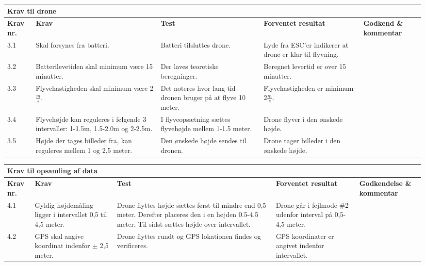     \centering
    \begin{tabular}{|p{}|p{3.2 cm}|p{3.2 cm}|p{3.2 cm}|p{2.2 cm}|}
			\hline
			\multicolumn{5}{|l|}{\textbf{{\large Krav til drone}}}\\ \hline
			\textbf{Krav nr.} & \textbf{Krav} & \textbf{Test} & \textbf{Forventet \newline resultat} & 			
			\textbf{Godkend \& \newline kommentar} \\ \hline
			
			3.1 & Skal forsynes fra batteri.
				& Batteri tilsluttes drone.
				& Lyde fra ESC'er indikerer at drone er klar til flyvning.
				& \\ \hline

			3.2 & Batterilevetiden skal minimum være 15 minutter.
				& Der laves teoretiske beregninger.
				& Beregnet levertid er over 15 minutter.
				&  \\ \hline
			
			3.3 & Flyvehastigheden skal minimum være 2$\frac{m}{s}$.
				& Det noteres hvor lang tid dronen bruger på at flyve 10 meter.
				& Flyvehastigheden er minimum 2$\frac{m}{s}$.
				& \\ \hline		
				
			3.4 & Flyvehøjde kan reguleres i følgende 3 intervaller: 1-1.5m, 1.5-2.0m og 2-2.5m.
				& I flyveopsætning sættes flyvehøjde mellem 1-1.5 meter.
				& Drone flyver i den ønskede højde.
				& \\ \hline	
				
			3.5 & Højde der tages billeder fra, kan reguleres mellem 1 og 2,5 meter.
				& Den ønskede højde sendes til dronen.
				& Drone tager billeder i den ønskede højde.
				& \\ \hline	
		\end{tabular}
	\label{tab:krav_1}

\vspace{2cm}

    \centering
    \begin{tabular}{|p{}|p{3.2 cm}|p{3.2 cm}|p{3.2 cm}|p{2.2 cm}|}
			\hline
			\multicolumn{5}{|l|}{\textbf{{\large Krav til opsamling af data}}}\\ \hline
			\textbf{Krav nr.} & \textbf{Krav} & \textbf{Test} & \textbf{Forventet \newline resultat} & 			
			\textbf{Godkendelse \& \newline kommentar} \\ \hline
			
			4.1 & Gyldig højdemåling ligger i intervallet 0,5 til 4,5 meter.
				& Drone flyttes højde sættes først til mindre end 0,5 meter. Derefter placeres den i en højden 0.5-4.5 meter. Til sidst sættes højde over intervallet. 
				& Drone går i fejlmode \#2 udenfor interval på 0,5-4,5 meter.
				& \\ \hline

			4.2 & GPS skal angive koordinat indenfor $\pm$ 2,5 meter. 
				& Drone flyttes rundt og GPS lokationen findes og verificeres.
				& GPS koordinater er angivet indenfor intervallet. 
				&  \\ \hline		
		\end{tabular}
	\label{tab:krav_1}
